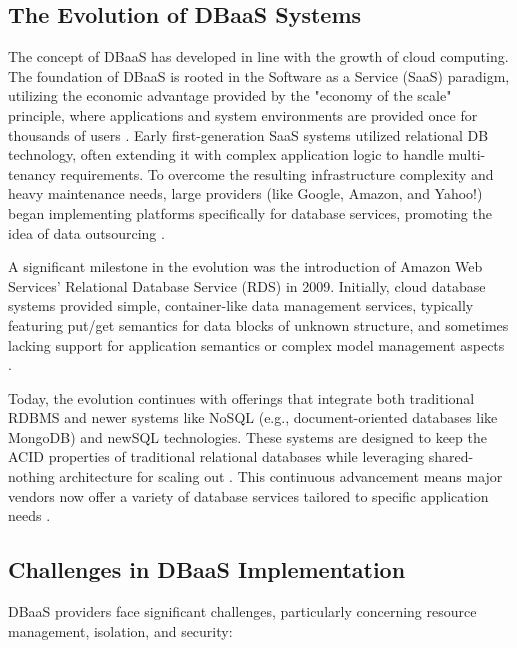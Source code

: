 \subsection{The Evolution of DBaaS Systems}
The concept of DBaaS has developed in line with the growth of cloud computing. The foundation of DBaaS is rooted in the Software as a Service (SaaS) paradigm, utilizing the economic advantage provided by the "economy of the scale" principle, where applications and system environments are provided once for thousands of users \cite{Database_as_a_service}.
Early first-generation SaaS systems utilized relational DB technology, often extending it with complex application logic to handle multi-tenancy requirements. To overcome the resulting infrastructure complexity and heavy maintenance needs, large providers (like Google, Amazon, and Yahoo!) began implementing platforms specifically for database services, promoting the idea of data outsourcing \cite{Database_as_a_service}.

A significant milestone in the evolution was the introduction of Amazon Web Services’ Relational Database Service (RDS) in 2009. Initially, cloud database systems provided simple, container-like data management services, typically featuring put/get semantics for data blocks of unknown structure, and sometimes lacking support for application semantics or complex model management aspects \cite{Database_as_a_service}.

Today, the evolution continues with offerings that integrate both traditional RDBMS and newer systems like NoSQL (e.g., document-oriented databases like MongoDB) and newSQL technologies. These systems are designed to keep the ACID properties of traditional relational databases while leveraging shared-nothing architecture for scaling out \cite{Database_as_a_service}. This continuous advancement means major vendors now offer a variety of database services tailored to specific application needs \cite{Security_Issues_and_Policies}.

\subsection{Challenges in DBaaS Implementation}
DBaaS providers face significant challenges, particularly concerning resource management, isolation, and security:

